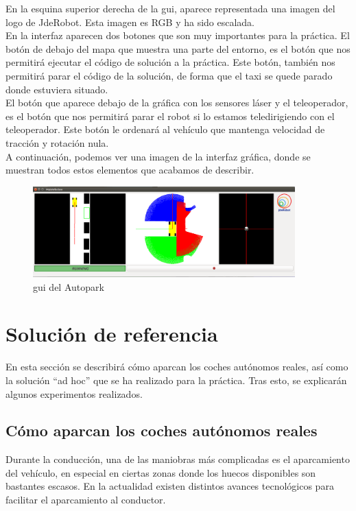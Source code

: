 En la esquina superior derecha de la \acrshort{gui}, aparece representada una imagen del logo de JdeRobot. Esta imagen es RGB y ha sido escalada.\\

En la interfaz aparecen dos botones que son muy importantes para la práctica. El botón de debajo del mapa que muestra una parte del entorno, es el botón que nos permitirá ejecutar el código de solución a la práctica. Este botón, también nos permitirá parar el código de la solución, de forma que el taxi se quede parado donde estuviera situado.\\

El botón que aparece debajo de la gráfica con los sensores láser y el teleoperador, es el botón que nos permitirá parar el robot si lo estamos teledirigiendo con el teleoperador. Este botón le ordenará al vehículo que mantenga velocidad de tracción y rotación nula.\\

A continuación, podemos ver una imagen de la interfaz gráfica, donde se muestran todos estos elementos que acabamos de describir.

\begin{figure}[H]
  \begin{center}
    \includegraphics[width=0.9\textwidth]{figures/Autopark/GUI_Autopark.png}
		\caption{\acrshort{gui} del Autopark}
		\label{fig.GUI_Autopark}
		\end{center}
\end{figure}

\section{Solución de referencia}
En esta sección se describirá cómo aparcan los coches autónomos reales, así como la solución ``ad hoc'' que se ha realizado para la práctica. Tras esto, se explicarán algunos experimentos realizados. 

\subsection{Cómo aparcan los coches autónomos reales}
Durante la conducción, una de las maniobras más complicadas es el aparcamiento del vehículo, en especial en ciertas zonas donde los huecos disponibles son bastantes escasos. En la actualidad existen distintos avances tecnológicos para facilitar el aparcamiento al conductor.\\


